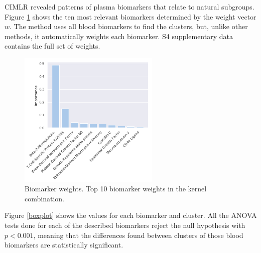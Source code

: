CIMLR revealed patterns of plasma biomarkers that relate to natural subgroups. Figure \ref{markers_imp} shows the ten most relevant biomarkers determined by the weight vector $w$. The method uses all blood biomarkers to find the clusters, but, unlike other methods, it automatically weights each biomarker. S4 supplementary data contains the full set of weights.   \\

\begin{figure}[!htbp]
\centering
\includegraphics[width=0.6\textwidth]{figures/cimlr/cluster_importance.png}
\caption[Biomarker weights.]{Biomarker weights. Top 10 biomarker weights in the kernel combination.}
\label{markers_imp}
\end{figure}

Figure \ref{boxplot} shows the values for each biomarker and cluster. All the ANOVA tests done for each of the described biomarkers reject the null hypothesis with $p<0.001$, meaning that the differences found between clusters of those blood biomarkers are statistically significant.  \\

